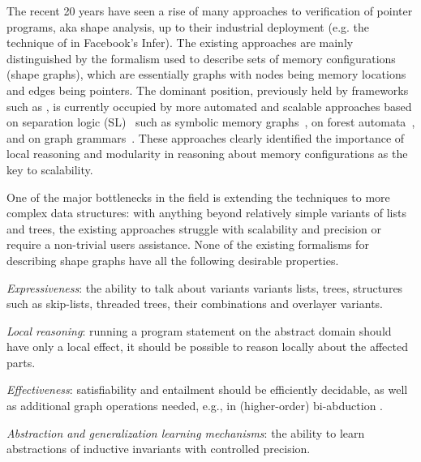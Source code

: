 {%
%
%
The recent 20 years have seen a rise of many approaches to verification of pointer programs, aka shape analysis, up to their industrial deployment (e.g. the technique of \cite{abduction11} in Facebook's Infer). 
%
The existing approaches are mainly distinguished by the formalism used to describe sets of memory configurations (shape graphs), which are essentially graphs with nodes being memory locations and edges being pointers.
%
The dominant position, previously held by frameworks such as \cite{pale,pale01},
is currently occupied by more automated and scalable approaches based on separation
logic (SL)~\cite{Reynolds:SepLogic:02,InvaderCAV07,sas07:chang_rival_necula} such as symbolic memory
graphs~\cite{dudka13sas}, on forest automata~\cite{forester12}, and on graph
grammars~\cite{Juggrnaut2015}.
These approaches clearly identified the importance of local reasoning and modularity in reasoning about memory configurations as the key to scalability.

One of the major bottlenecks in the field is extending the techniques to more complex data structures: with anything beyond relatively simple variants of lists and trees,
%
the existing approaches 
struggle with scalability and precision or require a non-trivial users assistance.
%
None of the existing formalisms for describing shape graphs have all the following desirable properties.
\begin{inparaenum}
\item
\emph{Expressiveness}: the ability to talk about variants variants lists, trees, structures such as skip-lists, threaded trees, their combinations and overlayer variants.   
\item
\emph{Local reasoning}: running a program statement on the abstract domain should have only a local effect, it should be possible to reason locally about the affected parts.
\item
\emph{Effectiveness}: 
 satisfiability and entailment should be efficiently decidable, as well as additional graph operations needed, e.g., in (higher-order) bi-abduction \cite{abduction11,locle:secondorder}.
\item
\emph{Abstraction and generalization learning mechanisms}: the ability to learn abstractions of inductive invariants with controlled precision.
\end{inparaenum}
%

}
